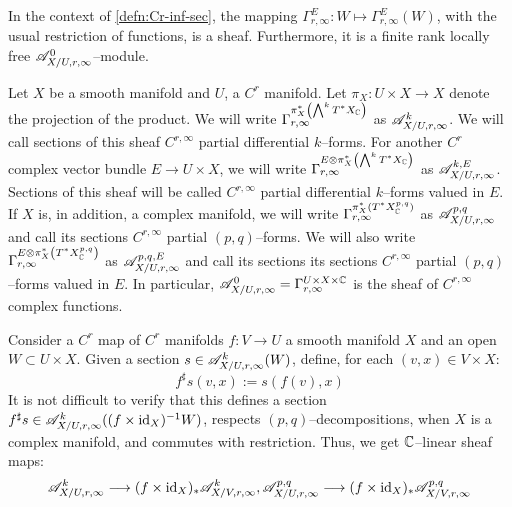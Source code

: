 \documentclass[11pt]{amsart}
\begin{document}
\begin{cor}
In the context of \cref{defn:Cr-inf-sec}, the mapping
$\Gamma^E_{r, \infty} : W \mapsto \Gamma^E_{r, \infty}(W)$, with the
usual restriction of functions, is a sheaf. Furthermore, it is a finite rank locally free
$\mathscr{A}^0_{X/U, r, \infty}$--module.
\end{cor}

\begin{defn}
Let $X$ be a smooth manifold and $U$, a $C^r$ manifold.
Let $\pi_X : U \times X \to X$ denote the projection of the product.
We will write $\Gamma^{\pi_X^*\br{\bigwedge^k T^*X_\bC}}_{r, \infty}$ as
$\mathscr{A}^k_{X/U, r, \infty}$. We will call sections of this sheaf $C^{r, \infty}$ partial differential
$k$--forms.
For another $C^r$ complex vector bundle $E \to U \times X$, we will write
$\Gamma^{E \otimes \pi_X^*\br{\bigwedge^k T^*X_\bC}}_{r, \infty}$ as
$\mathscr{A}^{k, E}_{X/U, r, \infty}$. Sections of this sheaf will be called 
$C^{r, \infty}$ partial differential $k$--forms valued in $E$.
If $X$ is, in addition, a complex manifold, we will write
$\Gamma^{\pi_X^*(T^*X_\mathbb{C}^{p, q})}_{r, \infty}$ as $\mathscr{A}^{p, q}_{X/U, r, \infty}$ and call
its sections $C^{r, \infty}$ partial $(p, q)$--forms.
We will also write
$\Gamma^{E \otimes \pi_X^*\br{T^*X^{p, q}_\bC}}_{r, \infty}$ as
$\mathscr{A}^{p, q, E}_{X/U, r, \infty}$ and call its sections
its sections $C^{r, \infty}$ partial $(p, q)$--forms valued in $E$.
In particular, $\mathscr{A}^0_{X/U, r, \infty} = \Gamma^{U \times X \times \mathbb{C}}_{r, \infty}$
is the sheaf of $C^{r, \infty}$ complex functions.
\end{defn}

\begin{cns}
Consider a $C^r$ map of $C^r$ manifolds $f : V \to U$ a smooth manifold $X$ and an open
$W \subset U \times X$.
Given a section $s \in \mathscr{A}^k_{X/U, r, \infty}(W)$, define, for each $(v, x) \in V \times X$:
\[
f^\sharp s(v, x) := s(f(v), x)
\]
It is not difficult to verify that this defines a section
$f^\sharp s \in \mathscr{A}^k_{X/U, r, \infty}((f \times \mathrm{id}_X)^{-1}W)$, respects
$(p, q)$--decompositions, when $X$ is a complex manifold, and commutes with restriction.
Thus, we get $\mathbb{C}$--linear sheaf maps:
\[
\sA^k_{X/U, r, \infty} \to (f \times \id_X)_*\sA^k_{X/V, r, \infty},
\sA^{p, q}_{X/U, r, \infty} \to (f \times \id_X)_*\sA^{p, q}_{X/V, r, \infty}
\]
\end{cns}
\end{document}
